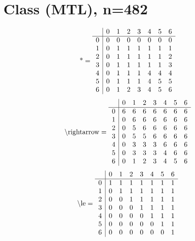 \documentclass[11pt]{article}
\begin{document}
\section{Class (MTL), n=482}
\[\text{*} = 
\begin{array}{r | r r r r r r r}
 & 0 & 1 & 2 & 3 & 4 & 5 & 6 \\ \hline
0 & 0 & 0 & 0 & 0 & 0 & 0 & 0 \\
1 & 0 & 1 & 1 & 1 & 1 & 1 & 1 \\
2 & 0 & 1 & 1 & 1 & 1 & 1 & 2 \\
3 & 0 & 1 & 1 & 1 & 1 & 1 & 3 \\
4 & 0 & 1 & 1 & 1 & 4 & 4 & 4 \\
5 & 0 & 1 & 1 & 1 & 4 & 5 & 5 \\
6 & 0 & 1 & 2 & 3 & 4 & 5 & 6 \\
\end{array}
\]
\[\text{\textbackslash rightarrow} = 
\begin{array}{r | r r r r r r r}
 & 0 & 1 & 2 & 3 & 4 & 5 & 6 \\ \hline
0 & 6 & 6 & 6 & 6 & 6 & 6 & 6 \\
1 & 0 & 6 & 6 & 6 & 6 & 6 & 6 \\
2 & 0 & 5 & 6 & 6 & 6 & 6 & 6 \\
3 & 0 & 5 & 5 & 6 & 6 & 6 & 6 \\
4 & 0 & 3 & 3 & 3 & 6 & 6 & 6 \\
5 & 0 & 3 & 3 & 3 & 4 & 6 & 6 \\
6 & 0 & 1 & 2 & 3 & 4 & 5 & 6 \\
\end{array}
\]
\[\text{\textbackslash le} = 
\begin{array}{r | r r r r r r r}
 & 0 & 1 & 2 & 3 & 4 & 5 & 6 \\ \hline
0 & 1 & 1 & 1 & 1 & 1 & 1 & 1 \\
1 & 0 & 1 & 1 & 1 & 1 & 1 & 1 \\
2 & 0 & 0 & 1 & 1 & 1 & 1 & 1 \\
3 & 0 & 0 & 0 & 1 & 1 & 1 & 1 \\
4 & 0 & 0 & 0 & 0 & 1 & 1 & 1 \\
5 & 0 & 0 & 0 & 0 & 0 & 1 & 1 \\
6 & 0 & 0 & 0 & 0 & 0 & 0 & 1 \\
\end{array}
\]
\end{document}
